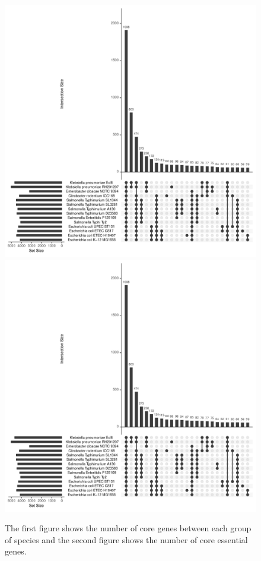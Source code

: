 \documentclass[12pt,letterpaper]{article}
\begin{document}
\begin{figure}
\centering
\includegraphics[scale=0.6, page=1]{upsetr.pdf}\\
\includegraphics[scale=0.6, page=2]{upsetr.pdf}
\caption{The first figure shows the number of core genes between each group of species and the second figure shows the number of core essential genes.}
\label{fig:upsetr}
\end{figure}
\end{document}
